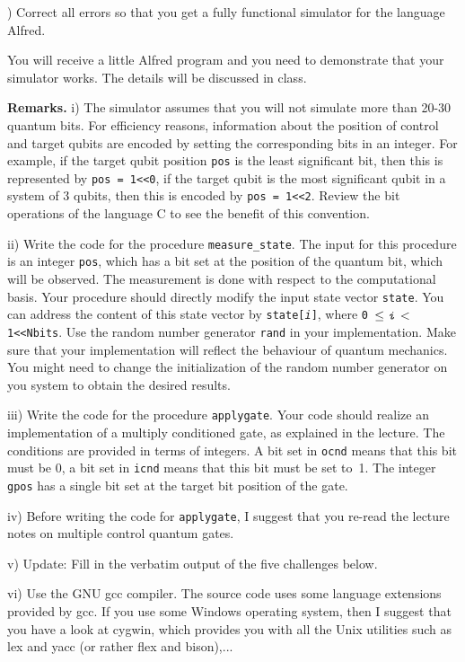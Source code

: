 \documentclass[12pt,a4paper]{article}
\theoremstyle{definition}
\begin{document}
) Correct all errors so that you get a fully functional simulator 
for the language Alfred. 
\medskip

You will receive a little Alfred program and you need to demonstrate
that your simulator works. The details will be discussed in class. 
\medskip

\noindent\textbf{Remarks.} i) The simulator assumes that you will 
not simulate more than 20-30 quantum bits. For efficiency reasons,
information about the position of control and target qubits are
encoded by setting the corresponding bits in an integer.  For example,
if the target qubit position \texttt{pos} is the least significant
bit, then this is represented by \texttt{pos = 1<<0}, if the target
qubit is the most significant qubit in a system of 3 qubits, then this
is encoded by \texttt{pos = 1<<2}. Review the bit operations of the
language C to see the benefit of this convention.

ii) Write the code for the procedure \texttt{measure\_state}.
The input for this procedure is an integer \texttt{pos}, which has a
bit set at the position of the quantum bit, which will be observed.
The measurement is done with respect to the computational basis. Your
procedure should directly modify the input state vector
\texttt{state}. You can address the content of this state vector by
\texttt{state[\textit{i}]}, where \texttt{0 $\le \texttt{\textit{i}} <
$ 1<<Nbits}.  Use the random number generator \texttt{rand} in your
implementation. Make sure that your implementation will reflect the
behaviour of quantum mechanics. You might need to change the
initialization of the random number generator on you system to obtain
the desired results.

iii) Write the code for the procedure \texttt{applygate}.
Your code should realize an implementation of a multiply conditioned
gate, as explained in the lecture. The conditions are provided in
terms of integers. A bit set in \texttt{ocnd} means that this bit must
be 0, a bit set in \texttt{icnd} means that this bit must be set to~1.
The integer \texttt{gpos} has a single bit set at the target bit
position of the gate.

iv) Before writing the code for \texttt{applygate}, I suggest that you
re-read the lecture notes on multiple control quantum gates. 

v) Update: Fill in the verbatim output of the five challenges below. 

vi) Use the GNU gcc compiler. The source code uses some language
extensions provided by gcc. If you use some Windows operating system,
then I suggest that you have a look at cygwin, which provides you with
all the Unix utilities such as lex and yacc (or rather flex and
bison),...
\end{document}

